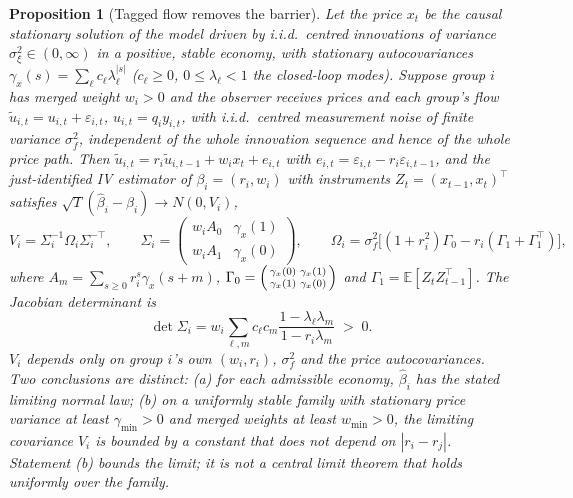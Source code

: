 \documentclass[12pt]{article}
\newtheorem{proposition}[theorem]{Proposition}
\theoremstyle{definition}
\theoremstyle{remark}
\newcommand{\E}{\mathbb{E}}
\begin{document}
\begin{proposition}[Tagged flow removes the barrier]\label{prop:tagged}
Let the price $x_t$ be the causal stationary solution of the model driven by i.i.d.\ centred innovations of variance $\sigma_\xi^2\in(0,\infty)$ in a positive, stable economy, with stationary autocovariances $\gamma_x(s)=\sum_\ell c_\ell\lambda_\ell^{|s|}$ ($c_\ell\ge0$, $0\le\lambda_\ell<1$ the closed-loop modes). Suppose group $i$ has merged weight $w_i>0$ and the observer receives prices and each group's flow $\tilde u_{i,t}=u_{i,t}+\varepsilon_{i,t}$, $u_{i,t}=q_iy_{i,t}$, with i.i.d.\ centred measurement noise of finite variance $\sigma_f^2$, independent of the whole innovation sequence and hence of the whole price path. Then $\tilde u_{i,t}=r_i\tilde u_{i,t-1}+w_ix_t+e_{i,t}$ with $e_{i,t}=\varepsilon_{i,t}-r_i\varepsilon_{i,t-1}$, and the just-identified IV estimator of $\beta_i=(r_i,w_i)$ with instruments $Z_t=(x_{t-1},x_t)^\top$ satisfies $\sqrt T(\hat\beta_i-\beta_i)\to N(0,V_i)$,
\begin{equation}\label{eq:ivvar}
V_i=\Sigma_i^{-1}\Omega_i\Sigma_i^{-\top},\qquad \Sigma_i=\begin{pmatrix}w_iA_0&\gamma_x(1)\\ w_iA_1&\gamma_x(0)\end{pmatrix},\qquad \Omega_i=\sigma_f^2\bigl[(1+r_i^2)\Gamma_0-r_i(\Gamma_1+\Gamma_1^\top)\bigr],
\end{equation}
where $A_m=\sum_{s\ge0}r_i^s\gamma_x(s+m)$, $\Gamma_0=\begin{psmallmatrix}\gamma_x(0)&\gamma_x(1)\\ \gamma_x(1)&\gamma_x(0)\end{psmallmatrix}$ and $\Gamma_1=\E[Z_tZ_{t-1}^\top]$. The Jacobian determinant is
\begin{equation}\label{eq:ivdet}
\det\Sigma_i=w_i\sum_{\ell,m}c_\ell c_m\frac{1-\lambda_\ell\lambda_m}{1-r_i\lambda_m}\;>\;0 .
\end{equation}
$V_i$ depends only on group $i$'s own $(w_i,r_i)$, $\sigma_f^2$ and the price autocovariances. Two conclusions are distinct: (a) for each admissible economy, $\hat\beta_i$ has the stated limiting normal law; (b) on a uniformly stable family with stationary price variance at least $\gamma_{\min}>0$ and merged weights at least $w_{\min}>0$, the limiting covariance $V_i$ is bounded by a constant that does not depend on $|r_i-r_j|$. Statement (b) bounds the limit; it is not a central limit theorem that holds uniformly over the family.
\end{proposition}
\end{document}
